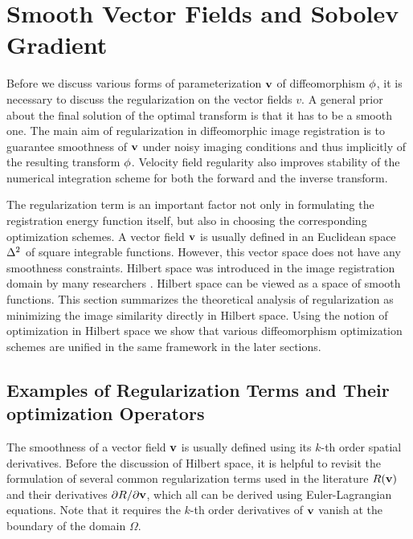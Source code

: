 \documentclass[letterpaper,12pt]{article}
\begin{document}
\section{Smooth Vector Fields and Sobolev Gradient}

Before we discuss various forms of parameterization $\mathbf{v}$ of
diffeomorphism $\phi$, it is necessary to discuss the regularization
on the vector fields $v$. A general prior about the final solution of
the optimal transform is that it has to be a smooth one. The main aim
of regularization in diffeomorphic image registration is to guarantee
smoothness of $\mathbf{v}$ under noisy imaging conditions and thus implicitly
of the resulting transform $\phi$.  Velocity field regularity also
improves stability of the numerical integration scheme for both the
forward and the inverse transform. 

The regularization term is an important factor not only in formulating
the registration energy function itself, but  also in choosing the
corresponding optimization schemes. A vector field $\mathbf{v}$ is usually
defined in an Euclidean space $\Delta^2$ of square integrable
functions. However, this vector space does not have any smoothness
constraints. Hilbert space was introduced in the image registration domain by many researchers \cite{Trouve1998, Beg2005Computing, Hernandez2008, Zikic2010}. Hilbert space can be viewed as a space of smooth functions. This section summarizes the theoretical analysis of regularization as minimizing the image similarity directly in Hilbert space. Using the notion of optimization in Hilbert space we show that various diffeomorphism optimization schemes are unified in the same framework in the later sections.


\subsection{Examples of Regularization Terms and Their optimization Operators}
\label{sec:regularizerexample}

The smoothness of a vector field $\mathbf{v}$ is usually defined using its $k$-th order spatial derivatives. Before the discussion of Hilbert space, it is helpful to revisit the formulation of several common regularization terms used in the literature \cite{Horn1981,Beg2005Computing,Ashburner2007,Vercauteren2009} $R(\mathbf{v})$ and their derivatives $\partial R/\partial\mathbf{v}$, which all can be derived using Euler-Lagrangian equations. Note that it requires the $k$-th order derivatives of $\mathbf{v}$ vanish at the boundary of the domain $\Omega$.
\end{document}
